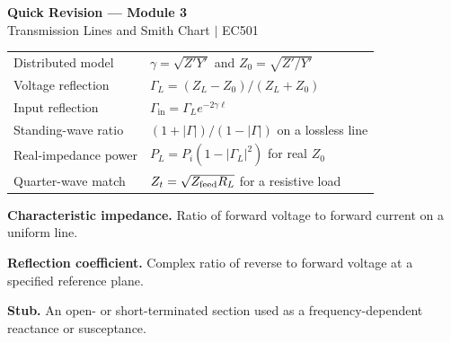 \documentclass[12pt,a4paper]{article}
\renewcommand{\arraystretch}{1.45}
\begin{document}
\newpage
\begin{center}
  {\large\bfseries\color{myred} Quick Revision --- Module 3}\\[3pt]
  {\small\color{mydark} Transmission Lines and Smith Chart $|$ EC501}
\end{center}
\noindent{\color{myred}\rule{\linewidth}{1.2pt}}
\begin{tcolorbox}[formulabox,title={Key Formulas at a Glance}]
\renewcommand{\arraystretch}{1.35}
\begin{tabularx}{\linewidth}{B{5.0cm}Y}
Distributed model & $\gamma=\sqrt{Z'Y'}$ and $Z_0=\sqrt{Z'/Y'}$ \\[3pt]
Voltage reflection & $\Gamma_L=(Z_L-Z_0)/(Z_L+Z_0)$ \\[3pt]
Input reflection & $\Gamma_{\mathrm{in}}=\Gamma_Le^{-2\gamma\ell}$ \\[3pt]
Standing-wave ratio & $(1+|\Gamma|)/(1-|\Gamma|)$ on a lossless line \\[3pt]
Real-impedance power & $P_L=P_i(1-|\Gamma_L|^2)$ for real $Z_0$ \\[3pt]
Quarter-wave match & $Z_t=\sqrt{Z_{\rm feed}R_L}$ for a resistive load \\[3pt]
\end{tabularx}
\end{tcolorbox}
\begin{tcolorbox}[defbox,title={One-Line Definitions}]
\textbf{Characteristic impedance.} Ratio of forward voltage to forward current on a uniform line.\par
\textbf{Reflection coefficient.} Complex ratio of reverse to forward voltage at a specified reference plane.\par
\textbf{Stub.} An open- or short-terminated section used as a frequency-dependent reactance or susceptance.\par
\end{tcolorbox}
\end{document}
